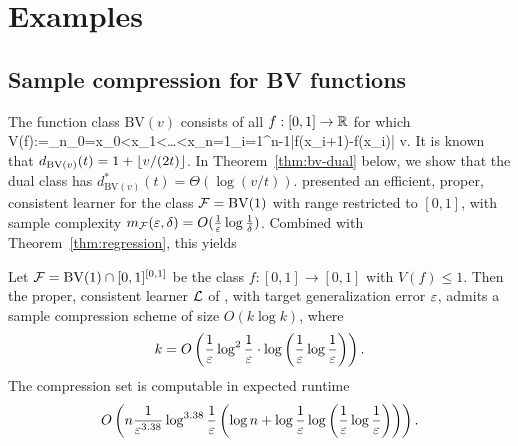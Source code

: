 \chapter{Examples}

\blindtext
    
    



\section{Sample compression for BV functions}

\label{sec:BV}
\newcommand{\gammat}{t}
The function class $\mathrm{BV}(v)$ consists of all $f:[0,1]\to\mathbb{R}$ for which
\beq
V(f):=\sup_{n\in\N}\sup_{0=x_0<x_1<\ldots<x_n=1}\sum_{i=1}^{n-1}|f(x_{i+1})-f(x_i)| \le v.
\eeq
It is known
\citep[Theorem 11.12]{MR1741038} that $d_{\mathrm{BV}(v)}(t)=1+\left\lfloor v/(2t)\right\rfloor$.
In Theorem~\ref{thm:bv-dual} below, we show that the dual class has
$d^*_{\mathrm{BV}(v)}(t)=\Theta\left(\log(v/t)\right)$.
\citet{DBLP:journals/iandc/Long04} presented an efficient, proper, consistent learner
for the class $\mathcal{F}=\mathrm{BV}(1)$ with range restricted to $[0,1]$,
with sample complexity
$m_{\mathcal{F}}(\varepsilon,\delta)=O(\frac1{\varepsilon}\log\frac1\delta)$.
Combined with Theorem~\ref{thm:regression}, this yields
\begin{corollary}
  Let $\mathcal{F}=\mathrm{BV}(1)\cap[0,1]^{[0,1]}$
  be the class
  $f:[0,1] \to [0,1]$ with $V(f)\le1$.
  Then the proper, consistent learner $\mathcal{L}$
  of \citet{DBLP:journals/iandc/Long04},
  with target generalization error $\varepsilon$,
  admits
  a sample compression scheme of size $O(k\log k)$, where
  \[k = {O}\left( \frac{1}{\varepsilon} \log^2 \frac{1}{\varepsilon} \cdot \log \left(\frac{1}{\varepsilon} \log \frac{1}{\varepsilon}\right)  \right).\]
The compression set is computable in expected runtime
  \[
    {O}\left(  n \frac{1}{\varepsilon^{3.38}} \log^{3.38} \frac{1}{\varepsilon}
      \left(
        \log n + \log \frac{1}{\varepsilon} \log
        \left(
          \frac{1}{\varepsilon} \log \frac{1}{\varepsilon}
        \right)
        \right) \right)
    .
  \]
\end{corollary}


